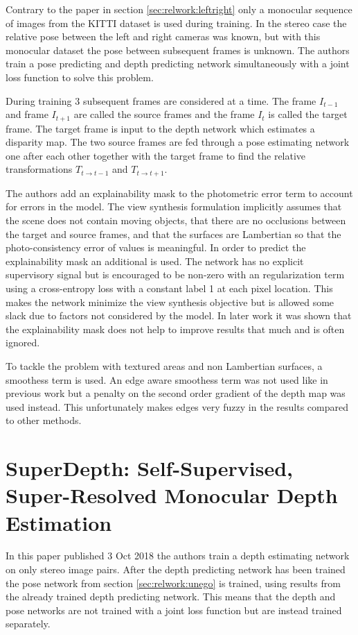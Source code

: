 Contrary to the paper in section \ref{sec:relwork:leftright} only a monocular sequence of images from the KITTI dataset is used during training. In the stereo case the relative pose between the left and right cameras was known, but with this monocular dataset the pose between subsequent frames is unknown. The authors train a pose predicting and depth predicting network simultaneously with a joint loss function to solve this problem.

During training 3 subsequent frames are considered at a time. The frame $I_{t-1}$ and frame $I_{t+1}$ are called the source frames and the frame $I_t$ is called the target frame. The target frame is input to the depth network which estimates a disparity map. The two source frames are fed through a pose estimating network one after each other together with the target frame to find the relative transformations $T_{t	\rightarrow t-1}$ and $T_{t	\rightarrow t+1}$.

The authors add an explainability mask to the photometric error term to account for errors in the model. The view synthesis formulation implicitly assumes that the scene does not contain moving objects, that there are no occlusions between the target and source frames, and that the surfaces are Lambertian so that the photo-consistency error of \abbrRGB values is meaningful. In order to predict the explainability mask an additional \abbrCNN is used. The network has no explicit supervisory signal but is encouraged to be non-zero with an regularization term using a cross-entropy loss with a constant label 1 at each pixel location. This makes the network minimize the view synthesis objective but is allowed some slack due to factors not considered by the model. In later work it was shown that the explainability mask does not help to improve results that much and is often ignored.

To tackle the problem with textured areas and non Lambertian surfaces, a smoothess term is used. An edge aware smoothess term was not used like in previous work\cite{leftright} but a penalty on the second order gradient of the depth map was used instead. This unfortunately makes edges very fuzzy in the results compared to other methods.

\section{SuperDepth: Self-Supervised, Super-Resolved Monocular Depth Estimation \cite{superdepth}}

In this paper published 3 Oct 2018 the authors train a depth estimating network on only stereo image pairs. After the depth predicting network has been trained the pose network from section \ref{sec:relwork:unego} is trained, using results from the already trained depth predicting network. This means that the depth and pose networks are not trained with a joint loss function but are instead trained separately.

